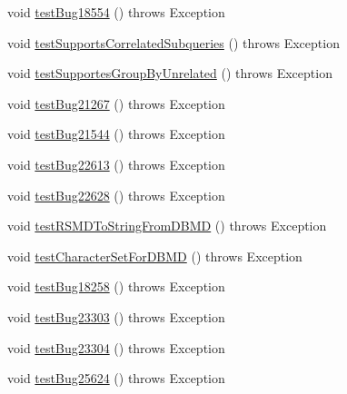 \begin{DoxyCompactItemize}
\item 
void \mbox{\hyperlink{classtestsuite_1_1regression_1_1_meta_data_regression_test_ac00a7a14db2a9fd6e4c1439959c0a67d}{test\+Bug18554}} ()  throws Exception 
\item 
void \mbox{\hyperlink{classtestsuite_1_1regression_1_1_meta_data_regression_test_a61c54cc997687666b3987a8c8e3d8647}{test\+Supports\+Correlated\+Subqueries}} ()  throws Exception 
\item 
void \mbox{\hyperlink{classtestsuite_1_1regression_1_1_meta_data_regression_test_ac35d7a3f186c9873b8e3796368af92c6}{test\+Supportes\+Group\+By\+Unrelated}} ()  throws Exception 
\item 
void \mbox{\hyperlink{classtestsuite_1_1regression_1_1_meta_data_regression_test_a45d7aaa5c8653a65c36f2e40ee7b154a}{test\+Bug21267}} ()  throws Exception 
\item 
void \mbox{\hyperlink{classtestsuite_1_1regression_1_1_meta_data_regression_test_ad063a1590627c6505de6ff9a64d90ab8}{test\+Bug21544}} ()  throws Exception 
\item 
void \mbox{\hyperlink{classtestsuite_1_1regression_1_1_meta_data_regression_test_a5b7642788b0d18aad6874a2770cfdf5d}{test\+Bug22613}} ()  throws Exception 
\item 
void \mbox{\hyperlink{classtestsuite_1_1regression_1_1_meta_data_regression_test_a1a86a1e268439afcb06e201e8c7bd486}{test\+Bug22628}} ()  throws Exception 
\item 
void \mbox{\hyperlink{classtestsuite_1_1regression_1_1_meta_data_regression_test_a50b58104e10eaa8f4be185c852cdf1ba}{test\+R\+S\+M\+D\+To\+String\+From\+D\+B\+MD}} ()  throws Exception 
\item 
void \mbox{\hyperlink{classtestsuite_1_1regression_1_1_meta_data_regression_test_aff18615ce9761d601ce3bfbf73901c2a}{test\+Character\+Set\+For\+D\+B\+MD}} ()  throws Exception 
\item 
void \mbox{\hyperlink{classtestsuite_1_1regression_1_1_meta_data_regression_test_af1076e63dffd2b6792697be0f509d039}{test\+Bug18258}} ()  throws Exception 
\item 
void \mbox{\hyperlink{classtestsuite_1_1regression_1_1_meta_data_regression_test_a91cb0cb606fa52c6106dad75b768de7a}{test\+Bug23303}} ()  throws Exception 
\item 
void \mbox{\hyperlink{classtestsuite_1_1regression_1_1_meta_data_regression_test_a5182df6da64a360d62191fc3be70fa75}{test\+Bug23304}} ()  throws Exception 
\item 
void \mbox{\hyperlink{classtestsuite_1_1regression_1_1_meta_data_regression_test_a2a97b03d5a86fcd988e7648006a385a6}{test\+Bug25624}} ()  throws Exception 

\end{DoxyCompactItemize}
